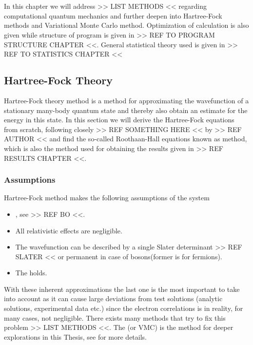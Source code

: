 \chapter{\label{chapter:3}}
    In this chapter we will address >> LIST METHODS << regarding computational
    quantum mechanics and further deepen into Hartree-Fock methods and
    Variational Monte Carlo method. Optimization of calculation is also given
    while structure of program is given in >> REF TO PROGRAM STRUCTURE CHAPTER
    <<. General statistical theory used is given in >> REF TO STATISTICS CHAPTER <<

\section{Hartree-Fock Theory}
    Hartree-Fock theory method is a method for approximating the wavefunction
    of a stationary many-body quantum state and thereby also obtain an estimate
    for the energy in this state. In this section we will derive the
    Hartree-Fock equations from scratch, following closely >> REF SOMETHING
    HERE << by >> REF AUTHOR << and find the so-called Roothaan-Hall equations
    known as  method, which is also the method
    used for obtaining the results given in >> REF RESULTS CHAPTER <<.

    \subsection{Assumptions}
        Hartree-Fock method makes the following assumptions of the system
            \begin{itemize}
                \item {}, see >> REF BO <<.
                \item All relativistic effects are negligible.
                \item The wavefunction can be described by a single Slater
                    determinant >> REF SLATER << or permanent in case of
                    bosons(former is for fermions).
                \item The  holds.
            \end{itemize}
        With these inherent approximations the last one is the most important
        to take into account as it can cause large deviations from test
        solutions (analytic solutions, experimental data etc.) since the
        electron correlations is in reality, for many cases, not negligible.
        There exists many methods that try to fix this problem >> LIST METHODS
        <<. The  (or VMC) is the method for
        deeper explorations in this Thesis, see  for more details.

